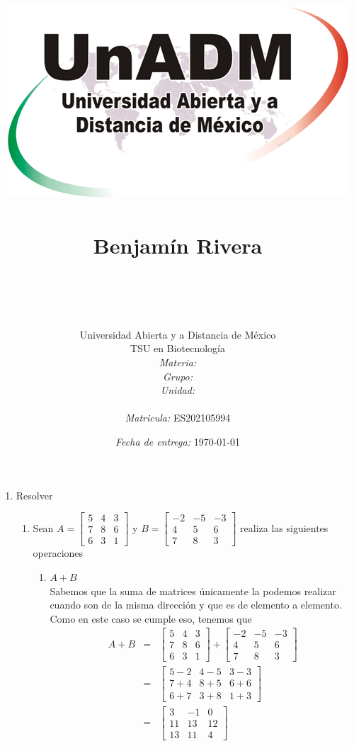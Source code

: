 \documentclass[12pt]{article}
\title{
	\includegraphics{../../../assets/logo-unadm} \\
	\ \\ Benjam\'in Rivera \\
	\bf{\titulo}\\\ \\}
\author{
	Universidad Abierta y a Distancia de México \\
	TSU en Biotecnolog\'ia \\
	\textit{Materia:} \materia \\
	\textit{Grupo:} \grupo \\
	\textit{Unidad:} \unidad \\
	\\
	\textit{Matricula:} ES202105994 }
\date{\textit{Fecha de entrega:} \today}
\begin{document}
\maketitle\newpage

\begin{enumerate}
	\item Resolver
	\begin{enumerate}
		\item Sean 
		$A = \begin{bmatrix}
			5 & 4 & 3 \\
			7 & 8 & 6 \\
			6 & 3 & 1
		\end{bmatrix}$ y 
		$B = \begin{bmatrix}
			-2&-5 &-3 \\
			4 & 5 & 6 \\
			7 & 8 & 3
		\end{bmatrix}$  
		realiza las siguientes operaciones
		\begin{enumerate}
			\item $A+B$ \\ Sabemos que la suma de matrices \'unicamente la podemos realizar cuando son de la misma direcci\'on y que es de elemento a elemento. Como en este caso se cumple eso, tenemos que
				\begin{eqnarray*}
					A + B &=& 	\begin{bmatrix}
									5 & 4 & 3 \\
									7 & 8 & 6 \\
									6 & 3 & 1
								\end{bmatrix} + \begin{bmatrix}
									-2&-5 &-3 \\
									4 & 5 & 6 \\
									7 & 8 & 3
								\end{bmatrix} \\
					&=& \begin{bmatrix}
					 		5-2 & 4-5 & 3-3 \\
							7+4 & 8+5 & 6+6 \\
							6+7 & 3+8 & 1+3
						\end{bmatrix} \\
					&=& \begin{bmatrix}
							3 &-1 & 0 \\
							11&13 &12 \\
							13&11 &4
						\end{bmatrix}
				\end{eqnarray*}
			

\end{enumerate}
\end{enumerate}
\end{enumerate}
\end{document}
